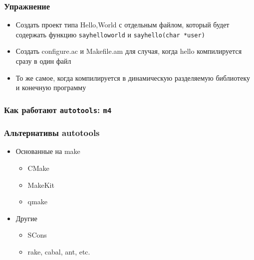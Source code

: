 \begin{frame}
 \frametitle{Упражнение}
 \begin{itemize}
  \item Создать проект типа Hello,World с отдельным файлом, который будет содержать функцию \texttt{sayhelloworld} и \texttt{sayhello(char *user)} 
  \item Создать configure.ac и Makefile.am для случая, когда hello компилируется сразу в один файл
  \item То же самое, когда компилируется в динамическую разделяемую библиотеку и конечную программу
 \end{itemize}
\end{frame}

\begin{frame}
 \frametitle{Как работают \texttt{autotools}: \texttt{m4}}
\end{frame}

\begin{frame}
 \frametitle{Альтернативы autotools}
\begin{itemize}
  \item{Основанные на make}
  \begin{itemize}
    \item CMake
    \item MakeKit
    \item qmake
  \end{itemize}
  \item{Другие}
    \begin{itemize}
      \item SCons
      \item rake, cabal, ant, etc.
    \end{itemize}
\end{itemize}
\end{frame}
